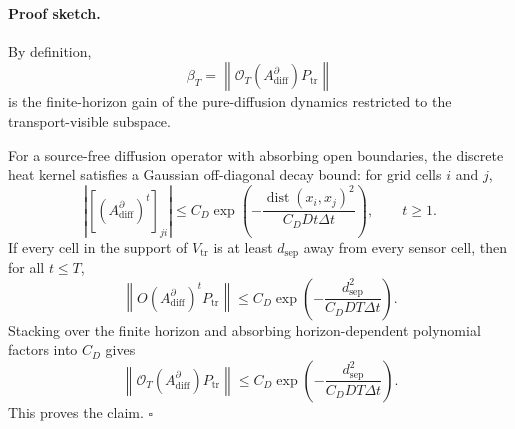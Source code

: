

\paragraph{Proof sketch.}
By definition,
\[
\beta_T
=
\left\|
\mathcal O_T(A_{\mathrm{diff}}^{\partial})
P_{\mathrm{tr}}
\right\|
\]
is the finite-horizon gain of the pure-diffusion dynamics restricted to
the transport-visible subspace.

For a source-free diffusion operator with absorbing open boundaries,
the discrete heat kernel satisfies a Gaussian off-diagonal decay bound:
for grid cells \(i\) and \(j\),
\[
\left|
\left[
(A_{\mathrm{diff}}^{\partial})^t
\right]_{ji}
\right|
\le
C_D
\exp\left(
-
\frac{
\operatorname{dist}(x_i,x_j)^2
}{
C_D D t\Delta t
}
\right),
\qquad t\ge 1.
\]
If every cell in the support of \(V_{\mathrm{tr}}\) is at least
\(d_{\mathrm{sep}}\) away from every sensor cell, then for all
\(t\le T\),
\[
\left\|
O(A_{\mathrm{diff}}^{\partial})^t P_{\mathrm{tr}}
\right\|
\le
C_D
\exp\left(
-
\frac{
d_{\mathrm{sep}}^2
}{
C_D D T\Delta t
}
\right).
\]
Stacking over the finite horizon and absorbing horizon-dependent
polynomial factors into \(C_D\) gives
\[
\left\|
\mathcal O_T(A_{\mathrm{diff}}^{\partial})
P_{\mathrm{tr}}
\right\|
\le
C_D
\exp\left(
-
\frac{
d_{\mathrm{sep}}^2
}{
C_D D T\Delta t
}
\right).
\]
This proves the claim.
\hfill \(\square\)


